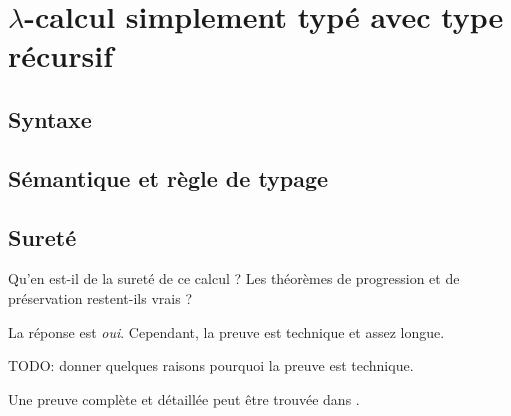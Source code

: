 \chapter{$\lambda$-calcul simplement typé avec type récursif}

\section{Syntaxe}

\section{Sémantique et règle de typage}

\section{Sureté}

Qu'en est-il de la sureté de ce calcul ? Les théorèmes de progression et de
préservation restent-ils vrais ?

La réponse est \textit{oui}. Cependant, la preuve est technique et assez longue.

TODO: donner quelques raisons pourquoi la preuve est technique.

Une preuve complète et détaillée peut être trouvée dans \cite{tapl-recursive-type-metatheory}.